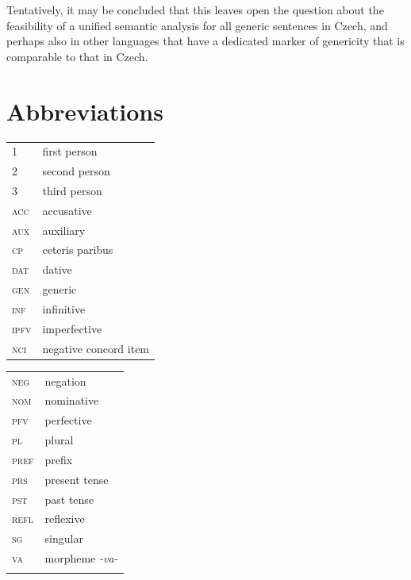 \documentclass[output=paper,colorlinks,citecolor=brown]{langscibook}
\begin{document}

\newpage
Tentatively, it may be concluded that this leaves open the question about the feasibility of a unified semantic analysis for all generic sentences in Czech, and perhaps also in other languages that have a  dedicated marker of genericity that is comparable to that in Czech.

\section*{Abbreviations}

\begin{tabularx}{.5\textwidth}{@{}lQ}
\textsc{1}&first person\\
\textsc{2}&second person\\
\textsc{3}&third person\\
\textsc{acc}&accusative\\
\textsc{aux}&auxiliary\\
\textsc{cp}&ceteris paribus\\
\textsc{dat}&dative\\
\textsc{gen}&generic\\
\textsc{inf}&infinitive\\
\textsc{ipfv}&imperfective\\
\textsc{nci}&negative concord item\\
\end{tabularx}
\begin{tabularx}{.5\textwidth}{lQ@{}}
\textsc{neg}&negation\\
\textsc{nom}&nominative\\
\textsc{pfv}&perfective\\
\textsc{pl}&plural\\
\textsc{pref}&prefix\\
\textsc{prs}&present tense\\
\textsc{pst}&past tense\\
\textsc{refl}&reflexive\\
\textsc{sg}&singular\\
\textsc{va}&morpheme \textit{-va-}\\
&\\ %
\end{tabularx}
\end{document}
